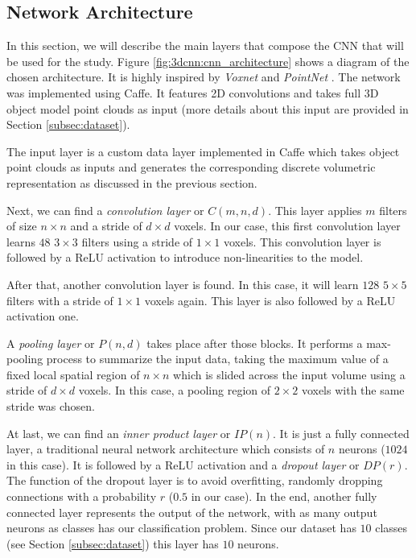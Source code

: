 \subsection{Network Architecture}
\label{cha:objrecog:sec:study:subsec:architecture}

In this section, we will describe the main layers that compose the \ac{CNN} that will be used for the study. Figure \ref{fig:3dcnn:cnn_architecture} shows a diagram of the chosen architecture. It is highly inspired by \emph{Voxnet} \cite{Maturana2015} and \emph{PointNet} \cite{Garcia-Garcia2016}. The network was implemented using Caffe. It features \acs{2D} convolutions and takes full \acs{3D} object model point clouds as input (more details about this input are provided in Section \ref{subsec:dataset}).

The input layer is a custom data layer implemented in Caffe which takes object point clouds as inputs and generates the corresponding discrete volumetric representation as discussed in the previous section.

Next, we can find a \emph{convolution layer} or $C(m, n, d)$. This layer applies $m$ filters of size $n\times n$ and a stride of $d\times d$ voxels. In our case, this first convolution layer learns $48$ $3\times3$ filters using a stride of $1\times 1$ voxels. This convolution layer is followed by a \ac{ReLU} activation to introduce non-linearities to the model.

After that, another convolution layer is found. In this case, it will learn $128$ $5\times5$ filters with a stride of $1\times 1$ voxels again. This layer is also followed by a \ac{ReLU} activation one.

A \emph{pooling layer} or $P(n, d)$ takes place after those blocks. It performs a max-pooling process to summarize the input data, taking the maximum value of a fixed local spatial region of $n\times n$ which is slided across the input volume using a stride of $d \times d$ voxels. In this case, a pooling region of $2\times 2$ voxels with the same stride was chosen.

At last, we can find an \emph{inner product layer} or $IP(n)$. It is just a fully connected layer, a traditional neural network architecture which consists of $n$ neurons ($1024$ in this case). It is followed by a \acs{ReLU} activation and a \emph{dropout layer} \cite{Srivastava2014} or $DP(r)$. The function of the dropout layer is to avoid overfitting, randomly dropping connections with a probability $r$ ($0.5$ in our case). In the end, another fully connected layer represents the output of the network, with as many output neurons as classes has our classification problem. Since our dataset has $10$ classes (see Section \ref{subsec:dataset}) this layer has $10$ neurons.

